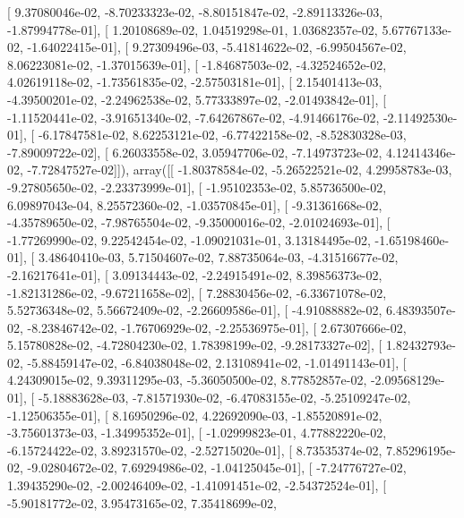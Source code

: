 \documentclass{article}
\begin{document}
       [  9.37080046e-02,  -8.70233323e-02,  -8.80151847e-02,
         -2.89113326e-03,  -1.87994778e-01],
       [  1.20108689e-02,   1.04519298e-01,   1.03682357e-02,
          5.67767133e-02,  -1.64022415e-01],
       [  9.27309496e-03,  -5.41814622e-02,  -6.99504567e-02,
          8.06223081e-02,  -1.37015639e-01],
       [ -1.84687503e-02,  -4.32524652e-02,   4.02619118e-02,
         -1.73561835e-02,  -2.57503181e-01],
       [  2.15401413e-03,  -4.39500201e-02,  -2.24962538e-02,
          5.77333897e-02,  -2.01493842e-01],
       [ -1.11520441e-02,  -3.91651340e-02,  -7.64267867e-02,
         -4.91466176e-02,  -2.11492530e-01],
       [ -6.17847581e-02,   8.62253121e-02,  -6.77422158e-02,
         -8.52830328e-03,  -7.89009722e-02],
       [  6.26033558e-02,   3.05947706e-02,  -7.14973723e-02,
          4.12414346e-02,  -7.72847527e-02]]), array([[ -1.80378584e-02,  -5.26522521e-02,   4.29958783e-03,
         -9.27805650e-02,  -2.23373999e-01],
       [ -1.95102353e-02,   5.85736500e-02,   6.09897043e-04,
          8.25572360e-02,  -1.03570845e-01],
       [ -9.31361668e-02,  -4.35789650e-02,  -7.98765504e-02,
         -9.35000016e-02,  -2.01024693e-01],
       [ -1.77269990e-02,   9.22542454e-02,  -1.09021031e-01,
          3.13184495e-02,  -1.65198460e-01],
       [  3.48640410e-03,   5.71504607e-02,   7.88735064e-03,
         -4.31516677e-02,  -2.16217641e-01],
       [  3.09134443e-02,  -2.24915491e-02,   8.39856373e-02,
         -1.82131286e-02,  -9.67211658e-02],
       [  7.28830456e-02,  -6.33671078e-02,   5.52736348e-02,
          5.56672409e-02,  -2.26609586e-01],
       [ -4.91088882e-02,   6.48393507e-02,  -8.23846742e-02,
         -1.76706929e-02,  -2.25536975e-01],
       [  2.67307666e-02,   5.15780828e-02,  -4.72804230e-02,
          1.78398199e-02,  -9.28173327e-02],
       [  1.82432793e-02,  -5.88459147e-02,  -6.84038048e-02,
          2.13108941e-02,  -1.01491143e-01],
       [  4.24309015e-02,   9.39311295e-03,  -5.36050500e-02,
          8.77852857e-02,  -2.09568129e-01],
       [ -5.18883628e-03,  -7.81571930e-02,  -6.47083155e-02,
         -5.25109247e-02,  -1.12506355e-01],
       [  8.16950296e-02,   4.22692090e-03,  -1.85520891e-02,
         -3.75601373e-03,  -1.34995352e-01],
       [ -1.02999823e-01,   4.77882220e-02,  -6.15724422e-02,
          3.89231570e-02,  -2.52715020e-01],
       [  8.73535374e-02,   7.85296195e-02,  -9.02804672e-02,
          7.69294986e-02,  -1.04125045e-01],
       [ -7.24776727e-02,   1.39435290e-02,  -2.00246409e-02,
         -1.41091451e-02,  -2.54372524e-01],
       [ -5.90181772e-02,   3.95473165e-02,   7.35418699e-02,
\end{document}
